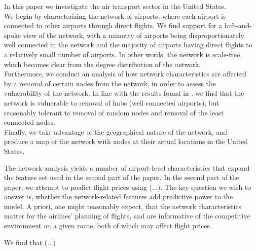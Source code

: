 \label{sec:intro}


In this paper we investigate the air transport sector in the United States.\\ We begin by characterizing the network of airports, where each airport is connected to other airports through direct flights. We find support for a hub-and-spoke view of the network, with a minority of airports being disproportionately well connected in the network and the majority of airports having direct flights to a relatively small number of airports. In other words, the network is scale-free, which becomes clear from the degree distribution of the network. \\ Furthermore, we conduct an analysis of how network characteristics are affected by a removal of certain nodes from the network, in order to assess the vulnerability of the network. In line with the results found in \cite{chi2004structural}, we find that the network is vulnerable to removal of hubs (well connected airports), but reasonably tolerant to removal of random nodes and removal of the least connected nodes. \\ Finally, we take advantage of the geographical nature of the network, and produce a map of the network with nodes at their actual locations in the United States. 

The network analysis yields a number of airport-level characteristics that expand the feature set used in the second part of the paper. In the second part of the paper, we attempt to predict flight prices using (...). The key question we wish to answer is, whether the network-related features add predictive power to the model. A priori, one might reasonably expect, that the network characteristics matter for the airlines' planning of flights, and are informative of the competitive environment on a given route, both of which may affect flight prices. 

We find that (...)
